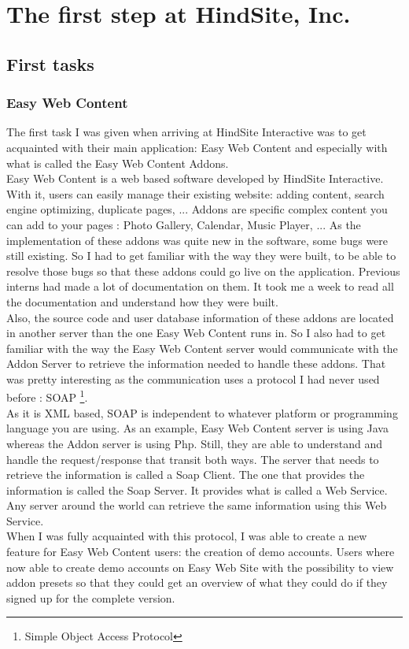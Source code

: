 \chapter{The first step at HindSite, Inc. }

\section{First tasks}

\subsection{Easy Web Content}

The first task I was given when arriving at HindSite Interactive was to get acquainted with their main application: Easy Web Content and especially with what is called the Easy Web Content Addons.
\\ Easy Web Content is a web based software developed by HindSite Interactive. With it, users can easily manage their existing website: adding content, search engine optimizing, duplicate pages, ... Addons are specific complex content you can add to your pages : Photo Gallery, Calendar, Music Player, ... As the implementation of these addons was quite new in the software, some bugs were still existing. So I had to get familiar with the way they were built, to be able to resolve those bugs so that these addons could go live on the application. Previous interns had made a lot of documentation on them. It took me a week to read all the documentation and understand how they were built.
\\ Also, the source code and user database information of these addons are located in another server than the one Easy Web Content runs in. So I also had to get familiar with the way the Easy Web Content server would communicate with the Addon Server to retrieve the information needed to handle these addons. That was pretty interesting as the communication uses a protocol I had never used before : SOAP \footnote{Simple Object Access Protocol}. %
\\As it is XML based, SOAP is independent to whatever platform or programming language you are using. As an example, Easy Web Content server is using Java whereas the Addon server is using Php. Still, they are able to understand and handle the request/response that transit both ways.
The server that needs to retrieve the information is called a Soap Client. The one that provides the information is called the Soap Server. It provides what is called a Web Service. Any server around the world can retrieve the same information using this Web Service.
\\ When I was fully acquainted with this protocol, I was able to create a new feature for Easy Web Content users: the creation of demo accounts. Users where now able to create demo accounts on Easy Web Site with the possibility to view addon presets so that they could get an overview of what they could do if they signed up for the complete version.


